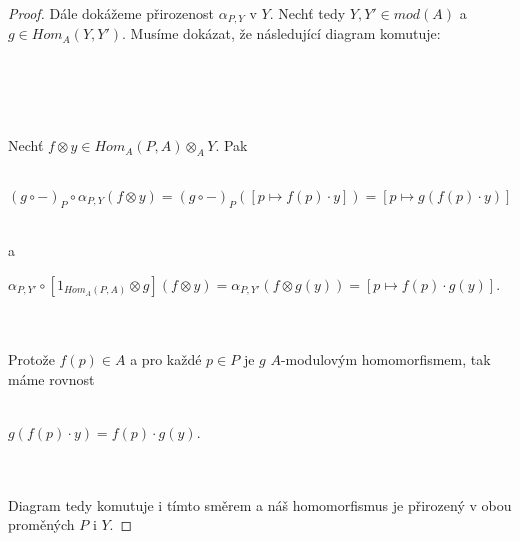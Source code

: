 \begin{proof}
        Dále dokážeme přirozenost $\alpha_{P,Y}$ v $Y$. Nechť tedy $Y,Y'\in 
        mod(A)$ a $g\in Hom_A(Y,Y')$. Musíme dokázat, že následující diagram komutuje:\\\\      
         \centerline{}\\\\\\
         Nechť $f\otimes y \in Hom_A(P, A)\otimes_A Y$. Pak \\\\
         \centerline{$
           (g\circ-)_P\circ\alpha_{P,Y}(f\otimes y)
           = (g\circ-)_P([p\mapsto f(p)\cdot y])
           =[p\mapsto g(f(p)\cdot y)]
         $} \\
         a \\
         \centerline{$
           \alpha_{P,Y'}\circ[1_{Hom_A(P,A)}\otimes g](f\otimes y)
           = \alpha_{P,Y'}(f\otimes g(y))
           = [p\mapsto f(p)\cdot g(y)]
         $.}\\\\
         Protože $f(p)\in A$ a pro každé $p\in P$ je $g$ $A$-modulovým 
         homomorfismem, tak máme rovnost \\\\
         \centerline{$g(f(p)\cdot y)=f(p)\cdot g(y)$.}\\\\         
         Diagram tedy komutuje i tímto směrem a náš homomorfismus je přirozený v obou proměných $P$ 
         i $Y$.         
      \end{proof}
      
